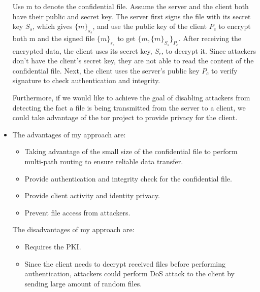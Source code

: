 \begin{itemize}
Use m to denote the confidential file. Assume the server and the client both have their public and secret key. The server first signs the file with its secret key $S_s$, which gives $\{m\}_{s_s}$, and use the public key of the client $P_c$ to encrypt both m and the signed file $\{m\}_{s_s}$ to get $\{m, \{m\}_{S_s}\}_{P_c}$. After receiving the encrypted data, the client uses its secret key, $S_c$, to decrypt it. Since attackers don't have the client's secret key, they are not able to read the content of the confidential file. Next, the client uses the server's  public key $P_c$ to verify signature to check authentication and integrity.

Furthermore, if we would like to achieve the goal of disabling attackers from detecting the fact a file is being transmitted from the server to a client, we could take advantage of the tor project to provide privacy for the client.

\item The advantages of my approach are:
\begin{itemize}
\item Taking advantage of the small size of the confidential file to perform multi-path routing to ensure reliable data transfer.
\item Provide authentication and integrity check for the confidential file.
\item Provide client activity and identity privacy.
\item Prevent file access from attackers.
\end{itemize}

The disadvantages of my approach are:
\begin{itemize}
\item Requires the PKI.
\item Since the client needs to decrypt received files before performing authentication, attackers could perform DoS attack to the client by sending large amount of random files.
\end{itemize}

\end{itemize}


